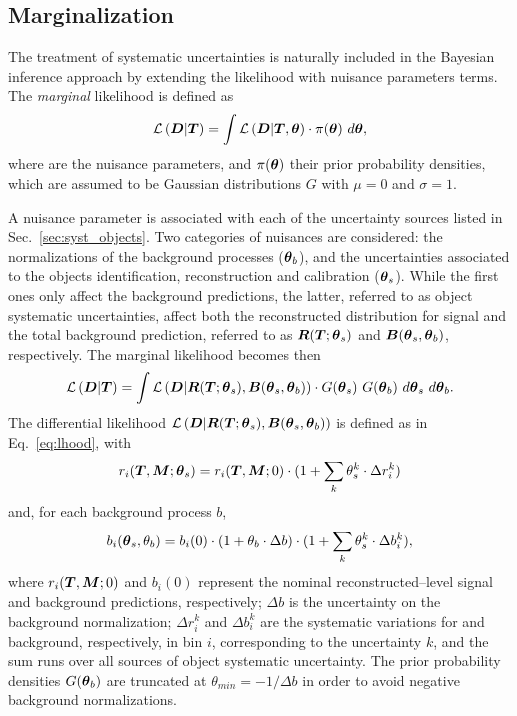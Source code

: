 \subsection{Marginalization}
\label{sec:marginalization}

The treatment of systematic uncertainties is naturally included in the
Bayesian inference approach by extending the likelihood
\conditionalLhood{\Data{}}{\Truth{}} with nuisance parameters terms.
The {\it marginal} likelihood is defined as
\begin{equation}
  \mathcal{L}\left(\boldsymbol{D}{}|\boldsymbol{T}{}\right)=
  \int
  \mathcal{L}\left(\boldsymbol{D}{}|\boldsymbol{T}{},\boldsymbol{\theta}{}\right) 
  \cdot{} \pi{}(\boldsymbol{\theta}{})
  ~d\boldsymbol{\theta}{},
\end{equation}
where \thetavec{} are the nuisance parameters, and
$\pi{}(\boldsymbol{\theta}{})$ their prior probability densities, which are
assumed to be Gaussian distributions $G$ with $\mu=0$ and $\sigma=1$.

A nuisance parameter is associated with each of the uncertainty sources
listed in Sec.~\ref{sec:syst_objects}. Two categories of nuisances
are considered: the normalizations of the background processes
($\boldsymbol{\theta}{}_b$), and the uncertainties associated to the objects
identification, reconstruction and calibration ($\boldsymbol{\theta}{}_s$).
While the first ones only affect the background predictions, the
latter, referred to as object systematic uncertainties, affect both the
reconstructed distribution for \ttbar{} signal and
the total background prediction, referred to as
$\boldsymbol{R}{}(\boldsymbol{T}{};\boldsymbol{\theta}{}_s)$ and
$\boldsymbol{B}{}(\boldsymbol{\theta}{}_s,\boldsymbol{\theta}{}_b)$, respectively.
The marginal likelihood becomes then
\begin{equation}
\label{eq:marginalLhood}
  \mathcal{L}\left(\boldsymbol{D}{}|\boldsymbol{T}{}\right)=
  \int
  \mathcal{L}\left(\boldsymbol{D}{}|\boldsymbol{R}{}(\boldsymbol{T}{};\boldsymbol{\theta}{}_s),\boldsymbol{B}{}(\boldsymbol{\theta}{}_s,\boldsymbol{\theta}{}_b)\right) 
  \cdot{} G(\boldsymbol{\theta}{}_s) ~G(\boldsymbol{\theta}{}_b)
  ~d\boldsymbol{\theta}{}_s ~d\boldsymbol{\theta}{}_b.
\end{equation}
The differential likelihood
$\mathcal{L}\left(\boldsymbol{D}{}|\boldsymbol{R}{}(\boldsymbol{T}{};\boldsymbol{\theta}{}_s),\boldsymbol{B}{}(\boldsymbol{\theta}{}_s,\boldsymbol{\theta}{}_b)\right)$
is defined as in Eq.~\ref{eq:lhood}, with 
\begin{equation}
r_i(\boldsymbol{T}{},\boldsymbol{M}{};\boldsymbol{\theta}{}_s) =
r_i(\boldsymbol{T}{},\boldsymbol{M}{};0) \cdot ( 1 + \sum_k
\theta_s^k\cdot\Delta r_i^k )
\end{equation}
and, for each background process $b$,
\begin{equation}
b_i(\boldsymbol{\theta}{}_s,\theta_b) =
b_i(0) \cdot ( 1 + \theta_b\cdot\Delta b) \cdot
(1 + \sum_k \theta_s^k\cdot\Delta b_i^k ),
\end{equation}
where $r_i(\boldsymbol{T}{},\boldsymbol{M}{};0)$ and $b_i(0)$ represent the
nominal reconstructed--level \ttbar{} signal and background
predictions, respectively; 
$\Delta b$ is the uncertainty on the background normalization;
$\Delta r_i^k$ and $\Delta b_i^k$ are the systematic variations for
\ttbar{} and background, respectively, in
bin $i$, corresponding to the uncertainty $k$, and the sum runs over
all sources of object systematic uncertainty.
The prior probability densities $G(\boldsymbol{\theta}{}_b)$ are truncated at
$\theta_{min}=-1/\Delta b$ in order to avoid negative background
normalizations. 

